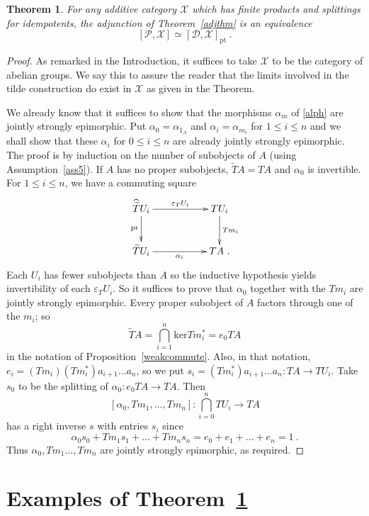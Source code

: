 \documentclass[a4paper,12pt,reqno]{amsart}
\newtheorem{theorem}{Theorem}[section] %
\theoremstyle{definition}
\theoremstyle{fact}
\theoremstyle{genquest}
\theoremstyle{step}
\newcommand{\lra}{\longrightarrow}
\newcommand{\ra}{\rightarrow}
\def\CD{{\mathscr D}}
\def\CP{{\mathscr P}}
\def\CX{{\mathscr X}}
\begin{document}
\begin{theorem}\label{mainthm}
For any additive category $\CX$ which has finite products and splittings for idempotents, 
the adjunction of Theorem~\ref{adjthm} is an equivalence 
$$[\CP,\CX] \simeq [\CD,\CX]_{\mathrm{pt}} \ .$$
\end{theorem}
\begin{proof}
As remarked in the Introduction, it suffices to take $\CX$ to be the category of 
abelian groups. We say this to assure the reader that the limits involved
in the tilde construction do exist in $\CX$ as given in the Theorem.
 
We already know that it suffices to show that the morphisms 
$\alpha_m$ of \eqref{alph} are jointly strongly
epimorphic. Put $\alpha_0 = \alpha_{1_A}$ and $\alpha_i = \alpha_{m_i}$ for $1\le i\le n$
and we shall show that these $\alpha_i$ for $0\le i\le n$ are already jointly strongly
epimorphic. The proof is by induction on the number of subobjects of $A$ (using
Assumption~\ref{ass5}).
If $A$ has no proper subobjects, $\widetilde{T}A = TA$ and $\alpha_0$ is invertible.  
For $1\le i\le n$, we have a commuting square 
\begin{equation*}
\xymatrix{
 \widehat{\widetilde{T}}U_i \ar[rr]^-{\varepsilon_TU_i} \ar[d]_-{\mathrm{pr}} && TU_i \ar[d]^-{Tm_i} \\
\widetilde{T}U_i \ar[rr]_-{\alpha_i} && TA \ .}
\end{equation*}
Each $U_i$ has fewer subobjects than $A$ so the inductive hypothesis
yields invertibility of each $\varepsilon_TU_i$. 
So it suffices to prove that $\alpha_0$ together with the $Tm_i$ are jointly strongly
epimorphic. Every proper subobject of $A$ factors through one of the $m_i$; so
$$\widetilde{T}A = \bigcap_{i=1}^{n}{\mathrm{ker}Tm_i^*} = e_0TA$$
in the notation of Proposition~\ref{weakcommute}.
Also, in that notation, $e_i = (Tm_i)(Tm_i^*)a_{i+1}\dots a_n$,
so we put $s_i = (Tm_i^*)a_{i+1}\dots a_n : TA \ra TU_i$.
Take $s_0$ to be the splitting of $\alpha_0 : e_0TA \ra TA$.
Then $$[\alpha_0,Tm_1,\dots , Tm_n] : \bigcap_{i=0}^n{TU_i} \lra TA$$ 
has a right inverse $s$ with entries $s_i$ since
$$\alpha_0s_0 +Tm_1s_1 +\dots + Tm_ns_n = e_0 + e_1 + \dots + e_n = 1 \ .$$
Thus $\alpha_0, Tm_1 \dots , Tm_n$ are jointly strongly epimorphic, as required.  
\end{proof}

\section{Examples of Theorem~\ref{mainthm}}\label{exx}
\end{document}
